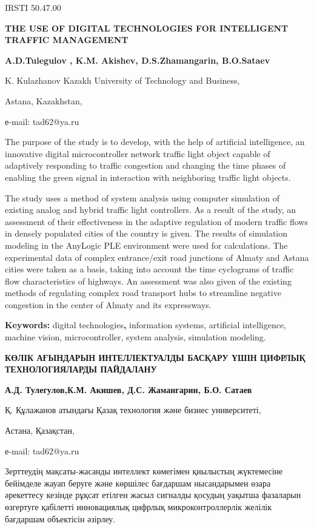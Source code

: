 IRSTI 50.47.00

\textbf{THE USE OF DIGITAL TECHNOLOGIES FOR INTELLIGENT TRAFFIC MANAGEMENT}

\textbf{A.D.Tulegulov , K.M. Akishev, D.S.Zhamangarin, B.O.Sataev}

K. Kulazhanov Kazakh University of Technology and Business,

Astana, Kazakhstan,

е-mail: tad62@ya.ru

The purpose of the study is to develop, with the help of artificial
intelligence, an innovative digital microcontroller network traffic
light object capable of adaptively responding to traffic congestion and
changing the time phases of enabling the green signal in interaction
with neighboring traffic light objects.

The study uses a method of system analysis using computer simulation of
existing analog and hybrid traffic light controllers. As a result of the
study, an assessment of their effectiveness in the adaptive regulation
of modern traffic flows in densely populated cities of the country is
given. The results of simulation modeling in the AnyLogic PLE
environment were used for calculations. The experimental data of complex
entrance/exit road junctions of Almaty and Astana cities were taken as a
basis, taking into account the time cyclograms of traffic flow
characteristics of highways. An assessment was also given of the
existing methods of regulating complex road transport hubs to streamline
negative congestion in the center of Almaty and its expressways.

\textbf{Keywords:} digital technologies\textbf{,} information systems,
artificial intelligence, machine vision, microcontroller, system
analysis, simulation modeling.

\textbf{КӨЛІК АҒЫНДАРЫН ИНТЕЛЛЕКТУАЛДЫ БАСҚАРУ ҮШІН ЦИФРЛЫҚ
ТЕХНОЛОГИЯЛАРДЫ ПАЙДАЛАНУ}

\textbf{А.Д. Тулегулов,К.М. Акишев, Д.С. Жамангарин, Б.О. Сатаев}

Қ. Құлажанов атындағы Қазақ технология және бизнес университеті,

Астана, Қазақстан,

е-mail: tad62@ya.ru

Зерттеудің мақсаты-жасанды интеллект көмегімен қиылыстың жүктемесіне
бейімделе жауап беруге және көршілес бағдаршам нысандарымен өзара
әрекеттесу кезінде рұқсат етілген жасыл сигналды қосудың уақытша
фазаларын өзгертуге қабілетті инновациялық цифрлық микроконтроллерлік
желілік бағдаршам объектісін әзірлеу.


